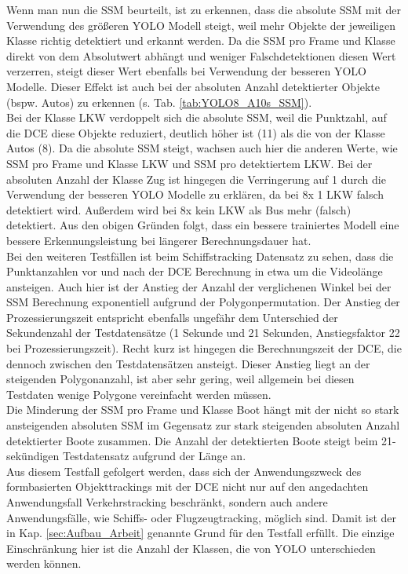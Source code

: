{{		Wenn man nun die SSM beurteilt, ist zu erkennen, dass die absolute SSM mit der Verwendung des größeren YOLO Modell steigt, weil mehr Objekte der jeweiligen Klasse richtig detektiert und erkannt werden. Da die SSM pro Frame und Klasse direkt von dem Absolutwert abhängt und weniger Falschdetektionen diesen Wert verzerren, steigt dieser Wert ebenfalls bei Verwendung der besseren YOLO Modelle. Dieser Effekt ist auch bei der absoluten Anzahl detektierter Objekte (bspw. Autos) zu erkennen (s. Tab. \ref{tab:YOLO8_A10s_SSM}). \\
		Bei der Klasse LKW verdoppelt sich die absolute SSM, weil die Punktzahl, auf die DCE diese Objekte reduziert, deutlich höher ist (11) als die von der Klasse Autos (8). Da die absolute SSM steigt, wachsen auch hier die anderen Werte, wie SSM pro Frame und Klasse LKW und SSM pro detektiertem LKW. Bei der absoluten Anzahl der Klasse Zug ist hingegen die Verringerung auf 1 durch die Verwendung der besseren YOLO Modelle zu erklären, da bei 8x 1 LKW falsch detektiert wird. Außerdem wird bei 8x kein LKW als Bus mehr (falsch) detektiert. 
		Aus den obigen Gründen folgt, dass ein bessere trainiertes Modell eine bessere Erkennungsleistung bei längerer Berechnungsdauer hat.  \\

		Bei den weiteren Testfällen ist beim Schiffstracking Datensatz zu sehen, dass die Punktanzahlen vor und nach der DCE Berechnung in etwa um die Videolänge ansteigen. Auch hier ist der Anstieg der Anzahl der verglichenen Winkel bei der SSM Berechnung exponentiell aufgrund der Polygonpermutation. Der Anstieg der Prozessierungszeit entspricht ebenfalls ungefähr dem Unterschied der Sekundenzahl der Testdatensätze (1 Sekunde und 21 Sekunden, Anstiegsfaktor 22 bei Prozessierungszeit). Recht kurz ist hingegen die Berechnungszeit der DCE, die dennoch zwischen den Testdatensätzen ansteigt. Dieser Anstieg liegt an der steigenden Polygonanzahl, ist aber sehr gering, weil allgemein bei diesen Testdaten wenige Polygone vereinfacht werden müssen. \\
		Die Minderung der SSM pro Frame und Klasse Boot hängt mit der nicht so stark ansteigenden absoluten SSM im Gegensatz zur stark steigenden absoluten Anzahl detektierter Boote  zusammen. Die Anzahl der detektierten Boote steigt beim 21-sekündigen Testdatensatz aufgrund der Länge an.\\
		Aus diesem Testfall gefolgert werden, dass sich der Anwendungszweck des formbasierten Objekttrackings mit der DCE nicht nur auf den angedachten Anwendungsfall Verkehrstracking beschränkt, sondern auch andere Anwendungsfälle, wie Schiffs- oder Flugzeugtracking, möglich sind. Damit ist der in Kap. \ref{sec:Aufbau_Arbeit} genannte Grund für den Testfall erfüllt. Die einzige Einschränkung hier ist die Anzahl der Klassen, die von YOLO unterschieden werden können.\\

}}
